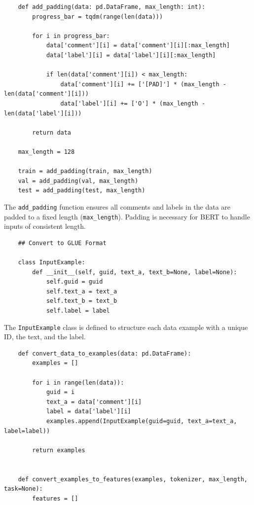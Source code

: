 \documentclass{solutionclass} %
\begin{document}
\begin{solution}
    \begin{lstlisting}
    def add_padding(data: pd.DataFrame, max_length: int):
        progress_bar = tqdm(range(len(data)))
        
        for i in progress_bar:
            data['comment'][i] = data['comment'][i][:max_length]
            data['label'][i] = data['label'][i][:max_length]
            
            if len(data['comment'][i]) < max_length:
                data['comment'][i] += ['[PAD]'] * (max_length - len(data['comment'][i]))
                data['label'][i] += ['O'] * (max_length - len(data['label'][i]))
                
        return data
    
    max_length = 128
    
    train = add_padding(train, max_length)
    val = add_padding(val, max_length)
    test = add_padding(test, max_length)
    \end{lstlisting}
    
    The \texttt{add\_padding} function ensures all comments and labels in the data are padded to a fixed length (\texttt{max\_length}). Padding is necessary for BERT to handle inputs of consistent length.
    
    \begin{lstlisting}
    ## Convert to GLUE Format
    
    class InputExample:
        def __init__(self, guid, text_a, text_b=None, label=None):
            self.guid = guid
            self.text_a = text_a
            self.text_b = text_b
            self.label = label
    \end{lstlisting}
    
    The \texttt{InputExample} class is defined to structure each data example with a unique ID, the text, and the label.
    
    \begin{lstlisting}
    def convert_data_to_examples(data: pd.DataFrame):
        examples = []
        
        for i in range(len(data)):
            guid = i
            text_a = data['comment'][i]
            label = data['label'][i]
            examples.append(InputExample(guid=guid, text_a=text_a, label=label))
            
        return examples
    
    
    def convert_examples_to_features(examples, tokenizer, max_length, task=None):
        features = []
        

\end{lstlisting}
\end{solution}
\end{document}
